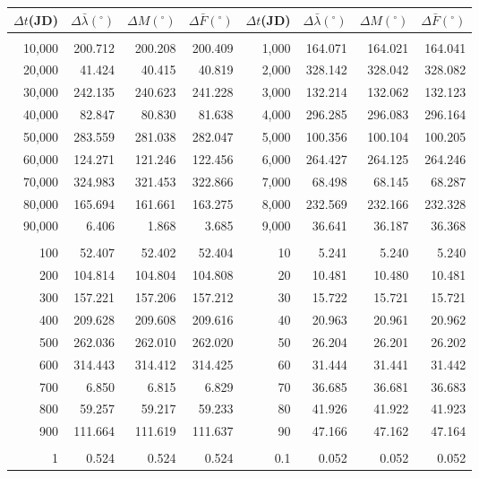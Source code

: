 \newpage
\begin{table}
\centering
\begin{tabular}{rrrr|rrrr}
$\Delta t$(JD)& $\Delta\bar{\lambda}(^\circ)$ &  $\Delta M(^\circ)$ & $\Delta \bar{F}(^\circ)$& $\Delta t$(JD) & $\Delta\bar{\lambda}(^\circ)$ & $\Delta M(^\circ)$ 
&$\Delta \bar{F}(^\circ)$\\ \hline
&&&&&&&\\[-1.75ex]
10,000 & 200.712 & 200.208 & 200.409 & 1,000 & 164.071 & 164.021 & 164.041\\
20,000 &  41.424 &  40.415 &  40.819 & 2,000 & 328.142 & 328.042 & 328.082\\
30,000 & 242.135 & 240.623 & 241.228 & 3,000 & 132.214 & 132.062 & 132.123\\
40,000 &  82.847 &  80.830 &  81.638 & 4,000 & 296.285 & 296.083 & 296.164\\
50,000 & 283.559 & 281.038 & 282.047 & 5,000 & 100.356 & 100.104 & 100.205\\
60,000 & 124.271 & 121.246 & 122.456 & 6,000 & 264.427 & 264.125 & 264.246\\
70,000 & 324.983 & 321.453 & 322.866 & 7,000 &  68.498 &  68.145 &  68.287\\
80,000 & 165.694 & 161.661 & 163.275 & 8,000 & 232.569 & 232.166 & 232.328\\
90,000 &   6.406 &   1.868 &   3.685 & 9,000 &  36.641 &  36.187 &  36.368\\
&&&&&&&\\
100 &  52.407 &  52.402 &  52.404 & 10 &   5.241 &   5.240 &   5.240\\
200 & 104.814 & 104.804 & 104.808 & 20 &  10.481 &  10.480 &  10.481\\
300 & 157.221 & 157.206 & 157.212 & 30 &  15.722 &  15.721 &  15.721\\
400 & 209.628 & 209.608 & 209.616 & 40 &  20.963 &  20.961 &  20.962\\
500 & 262.036 & 262.010 & 262.020 & 50 &  26.204 &  26.201 &  26.202\\
600 & 314.443 & 314.412 & 314.425 & 60 &  31.444 &  31.441 &  31.442\\
700 &   6.850 &   6.815 &   6.829 & 70 &  36.685 &  36.681 &  36.683\\
800 &  59.257 &  59.217 &  59.233 & 80 &  41.926 &  41.922 &  41.923\\
900 & 111.664 & 111.619 & 111.637 & 90 &  47.166 &  47.162 &  47.164\\
&&&&&&&\\
1 &   0.524 &   0.524 &   0.524 & 0.1 &   0.052 &   0.052 &   0.052\\

\end{tabular}
\end{table}
